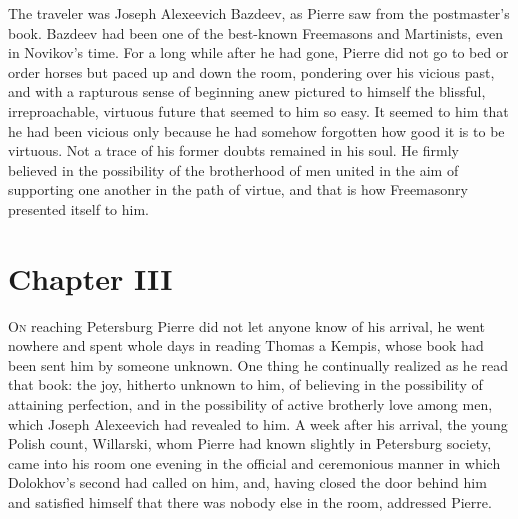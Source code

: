 The traveler was Joseph Alexeevich Bazdeev, as Pierre saw from
the postmaster's book. Bazdeev had been one of the best-known
Freemasons and Martinists, even in Novikov's time. For a long
while after he had gone, Pierre did not go to bed or order horses
but paced up and down the room, pondering over his vicious past,
and with a rapturous sense of beginning anew pictured to himself
the blissful, irreproachable, virtuous future that seemed to him
so easy. It seemed to him that he had been vicious only because
he had somehow forgotten how good it is to be virtuous. Not a
trace of his former doubts remained in his soul. He firmly
believed in the possibility of the brotherhood of men united in
the aim of supporting one another in the path of virtue, and that
is how Freemasonry presented itself to him.


\chapter*{Chapter III}
\ifaudio     
{} 
\fi

\lettrine[lines=2, loversize=0.3, lraise=0]{\initfamily O}{n}
reaching Petersburg Pierre did not let anyone know of his
arrival, he went nowhere and spent whole days in reading Thomas a
Kempis, whose book had been sent him by someone unknown. One
thing he continually realized as he read that book: the joy,
hitherto unknown to him, of believing in the possibility of
attaining perfection, and in the possibility of active brotherly
love among men, which Joseph Alexeevich had revealed to him. A
week after his arrival, the young Polish count, Willarski, whom
Pierre had known slightly in Petersburg society, came into his
room one evening in the official and ceremonious manner in which
Dolokhov's second had called on him, and, having closed the door
behind him and satisfied himself that there was nobody else in
the room, addressed Pierre.

